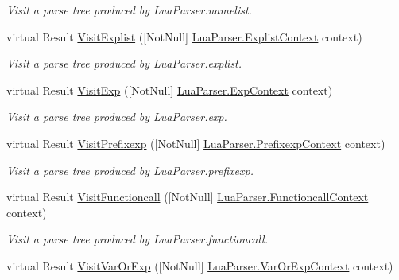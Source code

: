 \begin{DoxyCompactItemize}
\begin{DoxyCompactList}\small\item\em Visit a parse tree produced by Lua\+Parser.\+namelist. \end{DoxyCompactList}\item 
virtual Result \mbox{\hyperlink{classzlua_1_1_lua_base_visitor_a3ff9e871538d959c429d61daf4f8c0c3}{Visit\+Explist}} (\mbox{[}Not\+Null\mbox{]} \mbox{\hyperlink{classzlua_1_1_lua_parser_1_1_explist_context}{Lua\+Parser.\+Explist\+Context}} context)
\begin{DoxyCompactList}\small\item\em Visit a parse tree produced by Lua\+Parser.\+explist. \end{DoxyCompactList}\item 
virtual Result \mbox{\hyperlink{classzlua_1_1_lua_base_visitor_a0432a2115a2a561a97b72c9240082e28}{Visit\+Exp}} (\mbox{[}Not\+Null\mbox{]} \mbox{\hyperlink{classzlua_1_1_lua_parser_1_1_exp_context}{Lua\+Parser.\+Exp\+Context}} context)
\begin{DoxyCompactList}\small\item\em Visit a parse tree produced by Lua\+Parser.\+exp. \end{DoxyCompactList}\item 
virtual Result \mbox{\hyperlink{classzlua_1_1_lua_base_visitor_acad38edf087a3f799cf610a005c16715}{Visit\+Prefixexp}} (\mbox{[}Not\+Null\mbox{]} \mbox{\hyperlink{classzlua_1_1_lua_parser_1_1_prefixexp_context}{Lua\+Parser.\+Prefixexp\+Context}} context)
\begin{DoxyCompactList}\small\item\em Visit a parse tree produced by Lua\+Parser.\+prefixexp. \end{DoxyCompactList}\item 
virtual Result \mbox{\hyperlink{classzlua_1_1_lua_base_visitor_a17082d557201566c36ec9f056b20274d}{Visit\+Functioncall}} (\mbox{[}Not\+Null\mbox{]} \mbox{\hyperlink{classzlua_1_1_lua_parser_1_1_functioncall_context}{Lua\+Parser.\+Functioncall\+Context}} context)
\begin{DoxyCompactList}\small\item\em Visit a parse tree produced by Lua\+Parser.\+functioncall. \end{DoxyCompactList}\item 
virtual Result \mbox{\hyperlink{classzlua_1_1_lua_base_visitor_af08ef8c1371425dfa9b10a7df2e8e011}{Visit\+Var\+Or\+Exp}} (\mbox{[}Not\+Null\mbox{]} \mbox{\hyperlink{classzlua_1_1_lua_parser_1_1_var_or_exp_context}{Lua\+Parser.\+Var\+Or\+Exp\+Context}} context)

\end{DoxyCompactItemize}
